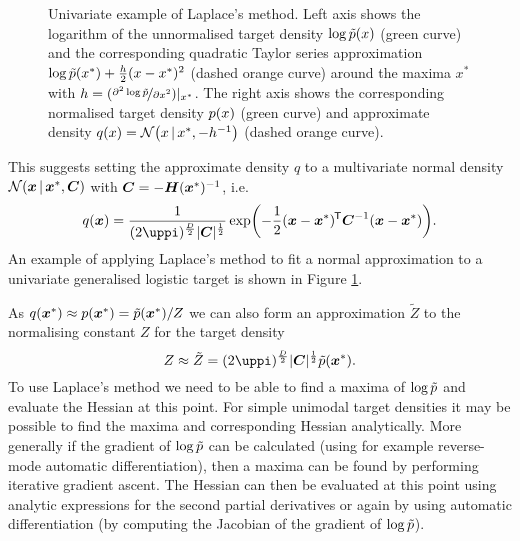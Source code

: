 \begin{figure}[!t]
\centering
{}
\vspace{-3mm}
\caption[Univariate example of Laplace's method.]{Univariate example of Laplace's method. Left axis shows the logarithm of the unnormalised target density $\log\tilde{p}(x)$ (green curve) and the corresponding quadratic Taylor series approximation $\log\tilde{p}(x^*) + \frac{h}{2}(x-x^*)^2$ (dashed orange curve) around the maxima $x^*$ with $h = (\nicefrac{\partial^2\log\tilde{p}}{\partial x^2})|_{x^*}$. The right axis shows the corresponding normalised target density $p(x)$ (green curve) and approximate density $q(x) = \nrm{x \gvn x^*, -h^{-1}}$ (dashed orange curve).}
\label{fig:laplace-approximation-example}
\end{figure}

This suggests setting the approximate density $q$ to a multivariate normal density $\nrm{\vct{x} \gvn \vct{x}^*,\mtx{C}}$ with $\boldsymbol{C} = -\boldsymbol{H}(\boldsymbol{x}^*)^{-1}$, i.e.
\begin{equation}\label{eq:laplace-approximation}
  q(\vct{x}) = 
  \frac{1}{(2\uppi)^{\frac{D}{2}}|\mtx{C}|^{\frac{1}{2}}} 
  \exp\lpa-\frac{1}{2}(\vct{x}-\vct{x}^*)\tr\mtx{C}^{-1}(\vct{x}-\vct{x}^*)\rpa.
\end{equation}
An example of applying Laplace's method to fit a normal approximation to a univariate generalised logistic target is shown in Figure \ref{fig:laplace-approximation-example}.

As $q(\boldsymbol{x}^*) \approx p(\boldsymbol{x}^*) = \tilde{p}(\boldsymbol{x}^*) / Z$ we can also form an approximation $\tilde{Z}$ to the normalising constant $Z$ for the target density
\begin{equation}\label{eq:laplace-approximation-normalising-const}
  Z \approx \tilde{Z} = (2\uppi)^{\frac{D}{2}} |\mtx{C}|^{\frac{1}{2}}\utgtdens(\vct{x}^*).
\end{equation}
To use Laplace's method we need to be able to find a maxima of $\log\tilde{p}$ and evaluate the Hessian at this point. For simple unimodal target densities it may be possible to find the maxima and corresponding Hessian analytically. More generally if the gradient of $\log\tilde{p}$ can be calculated (using for example reverse-mode automatic differentiation), then a maxima can be found by performing iterative gradient ascent. The Hessian can then be evaluated at this point using analytic expressions for the second partial derivatives or again by using automatic differentiation (by computing the Jacobian of the gradient of $\log\tilde{p}$).

